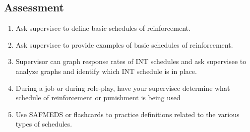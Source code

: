 \subsection{Assessment}
\begin{enumerate}
\item Ask supervisee to define basic schedules of reinforcement.
\item Ask supervisee to provide examples of basic schedules of reinforcement.
\item Supervisor can graph response rates of INT schedules and ask supervisee to analyze graphs and identify which INT schedule is in place.
%
\item During a job or during role-play, have your supervisee determine what schedule of reinforcement or punishment is being used
\item Use SAFMEDS or flashcards to practice definitions related to the various types of schedules.
\end{enumerate}
%
